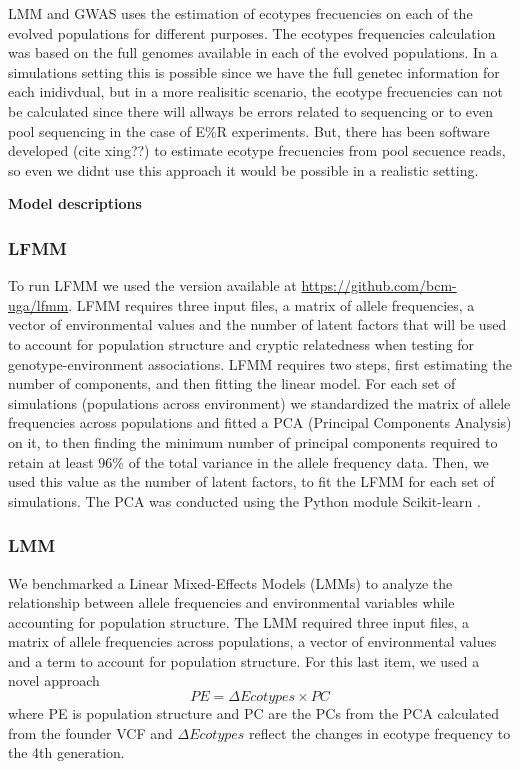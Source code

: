 \documentclass{article}
\begin{document}
LMM and GWAS %
uses the estimation of ecotypes frecuencies on each of the evolved populations for different purposes. The ecotypes frequencies calculation was based on the full genomes available in each of the evolved populations. In a simulations setting this is possible since we have the full genetec information for each inidivdual, but in a more realisitic scenario, the ecotype frecuencies can not be calculated since there will allways be errors related to sequencing or to even pool sequencing in the case of E\%R experiments. But, there has been software developed (cite xing??) to estimate ecotype frecuencies from pool secuence reads, so even we didnt use this approach it would be possible in a realistic setting. 

\textbf{Model descriptions}

\subsubsection{LFMM}
To run LFMM we used the version available at \url{https://github.com/bcm-uga/lfmm}. LFMM requires three input files, a matrix of allele frequencies, a vector of environmental values and the number of latent factors that will be used to account for population structure and cryptic relatedness when testing for genotype-environment associations. LFMM requires two steps, first estimating the number of components, and then fitting the linear model. For each set of simulations (populations across environment) we standardized the matrix of allele frequencies across populations and fitted a PCA (Principal Components Analysis) on it, to then finding the minimum number of principal components required to retain at least 96\% of the total variance in the allele frequency data. Then, we used this value as the number of latent factors, to fit the LFMM for each set of simulations. The PCA was conducted using the Python module Scikit-learn \citep{Pedregosa2011-tp}.

\subsubsection{LMM}
We benchmarked a Linear Mixed-Effects Models (LMMs) to analyze the relationship between allele frequencies and environmental variables while accounting for population structure. The LMM required three input files, a matrix of allele frequencies across populations, a vector of environmental values and a term to account for population structure. For this last item, we used a novel approach 
\[
PE = \Delta Ecotypes \times PC 
\]
where PE is population structure and PC are the PCs from the PCA calculated from the founder VCF and $\Delta Ecotypes$ reflect the changes in ecotype frequency to the 4th generation. 
\end{document}
